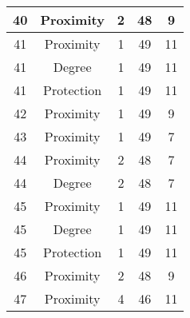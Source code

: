 \documentclass[results.tex]{subfiles}
\begin{document}
\begin{center}
\begin{tabular}{| c || c | c | c | c |}
            \hline
            40                      & Proximity                    & 2                      & 48                      & 9                    \\
            \hline
            41                      & Proximity                    & 1                      & 49                      & 11                   \\
            \hline
            41                      & Degree                       & 1                      & 49                      & 11                   \\
            \hline
            41                      & Protection                   & 1                      & 49                      & 11                   \\
            \hline
            42                      & Proximity                    & 1                      & 49                      & 9                    \\
            \hline
            43                      & Proximity                    & 1                      & 49                      & 7                    \\
            \hline
            44                      & Proximity                    & 2                      & 48                      & 7                    \\
            \hline
            44                      & Degree                       & 2                      & 48                      & 7                    \\
            \hline
            45                      & Proximity                    & 1                      & 49                      & 11                   \\
            \hline
            45                      & Degree                       & 1                      & 49                      & 11                   \\
            \hline
            45                      & Protection                   & 1                      & 49                      & 11                   \\
            \hline
            46                      & Proximity                    & 2                      & 48                      & 9                    \\
            \hline
            47                      & Proximity                    & 4                      & 46                      & 11                   \\

\end{tabular}
\end{center}
\end{document}
